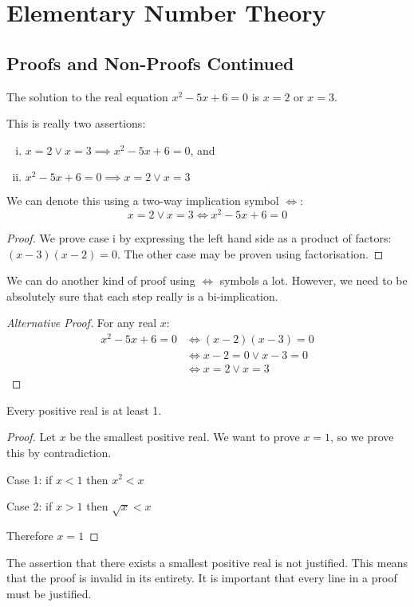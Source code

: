 \documentclass{article}
\begin{document}
\section{Elementary Number Theory}
\subsection{Proofs and Non-Proofs Continued}
\begin{claim}
	The solution to the real equation $x^2-5x+6=0$ is $x=2$ or $x=3$.
\end{claim}
\begin{note}
	This is really two assertions:
	\begin{enumerate}[i.]
		\item $x=2 \lor x=3 \implies x^2 - 5x + 6 = 0$, and
		\item $x^2 - 5x + 6 = 0 \implies x=2 \lor x=3$
	\end{enumerate}
	We can denote this using a two-way implication symbol $\iff$:
	\[ x=2 \lor x=3 \iff x^2 - 5x + 6 = 0 \]
\end{note}
\begin{proof}
	We prove case i by expressing the left hand side as a product of factors: $(x-3)(x-2)=0$. The other case may be proven using factorisation.
\end{proof}

We can do another kind of proof using $\iff$ symbols a lot. However, we need to be absolutely sure that each step really is a bi-implication.
\begin{proof}[Alternative Proof]
	For any real $x$:
	\begin{align*}
		x^2-5x+6=0 & \iff (x-2)(x-3) = 0       \\
		           & \iff x-2 = 0 \lor x-3 = 0 \\
		           & \iff x=2 \lor x = 3
	\end{align*}
\end{proof}

\begin{claim}
	Every positive real is at least 1.
\end{claim}
\begin{proof}
	Let $x$ be the smallest positive real. We want to prove $x=1$, so we prove this by contradiction.

	Case 1: if $x < 1$ then $x^2 < x$ \contradiction

	Case 2: if $x > 1$ then $\sqrt{x} < x$ \contradiction

	Therefore $x=1$
\end{proof}
\begin{note}
	The assertion that there exists a smallest positive real is not justified. This means that the proof is invalid in its entirety. It is important that every line in a proof must be justified.
\end{note}
\end{document}
